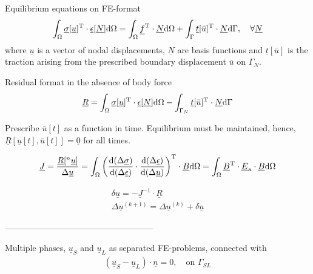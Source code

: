 \documentclass[a4paper,11pt]{article}
\newcommand{\dderiv}[2]{\frac{\mathrm{d} #1}{\mathrm{d} #2}}
\newcommand{\rmd}{{\rm d}}
\newcommand{\uv}{\underline}
\newcommand{\rmT}{{\rm T}}
\begin{document}
Equilibrium equations on FE-format
\begin{align}
	\int_\Omega \uv{\sigma}[\uv{u}]^\rmT\cdot\uv{\epsilon}[\uv{N}]\rmd\Omega = 
		\int_\Omega\uv{f}^\rmT\cdot\uv{N} \rmd\Omega + 
		\int_\Gamma\uv{t}[\bar u]^\rmT\cdot\uv{N}\rmd\Gamma, \quad \forall \uv{N}
\end{align}
where $\uv{u}$ is a vector of nodal displacements, $\uv{N}$ are basis functions and $\uv{t}[\bar u]$ is the traction arising from the prescribed boundary displacement $\bar u$ on $\Gamma_N$.

Residual format in the absence of body force
\begin{align}
	\uv{R} = \int_\Omega \uv{\sigma}[\uv{u}]^\rmT\cdot\uv{\epsilon}[\uv{N}]\rmd\Omega - 
		\int_{\Gamma_N} \uv{t}[\bar u]^\rmT\cdot\uv{N}\rmd\Gamma
\end{align}

Prescribe $\bar u[t]$ as a function in time. Equilibrium must be maintained, hence, $\uv{R}[\uv u[t],\bar u[t]] = \uv 0$ for all times.

\begin{align}
	\uv{J} = \frac{\uv{R}[{}^n\uv u]}{\Delta\uv u} = 
		\int_\Omega \left(\dderiv{(\Delta\uv\sigma)}{(\Delta\uv\epsilon)}\cdot\dderiv{(\Delta\uv\epsilon)}{(\Delta\uv u)}\right)^\rmT\cdot\uv B \rmd\Omega = 
		\int_\Omega \uv B^\rmT \cdot \uv E_{\rm a} \cdot \uv B \rmd\Omega
\end{align}

\begin{align}
	\delta\uv u = -\uv J^{-1} \cdot \uv R\\
	\Delta\uv u^{(k+1)} = \Delta\uv u^{(k)} + \delta\uv u
\end{align}

-----------------------------------------------------

Multiple phases, $\uv u_S$ and $\uv u_L$ as separated FE-problems, connected with
\begin{align}
	(\uv u_S - \uv u_L) \cdot \uv n = 0, \quad \text{on $\Gamma_{SL}$}
\end{align}
\end{document}
